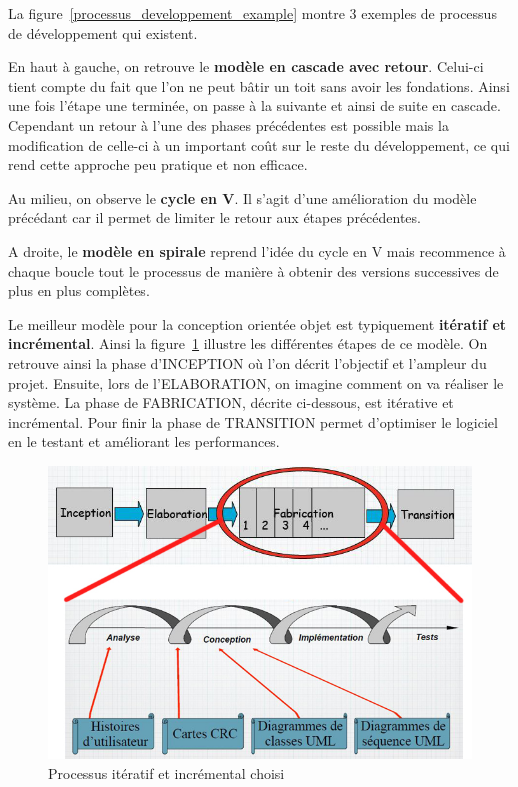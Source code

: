 La figure~\ref{processus_developpement_example}
montre 3 exemples de processus de développement qui existent.

En haut à gauche, on retrouve le \textbf{modèle en cascade avec retour}.
Celui-ci tient compte du fait que l'on ne peut bâtir
un toit sans avoir les fondations.
Ainsi une fois l'étape une terminée,
on passe à la suivante et ainsi de suite en cascade.
Cependant un retour à l'une des phases précédentes est possible mais
la modification de celle-ci à un important coût sur le reste du développement,
ce qui rend cette approche peu pratique et non efficace.

Au milieu, on observe le \textbf{cycle en V}.
Il s'agit d'une amélioration du modèle précédant
car il permet de limiter le retour aux étapes précédentes.

A droite, le \textbf{modèle en spirale} reprend l'idée du cycle en V mais
recommence à chaque boucle tout le processus de manière à obtenir
des versions successives de plus en plus complètes.

Le meilleur modèle pour la conception orientée objet est
typiquement \textbf{itératif et incrémental}.
Ainsi la figure~\ref{processus_developpement_choisi}
illustre les différentes étapes de ce modèle.
On retrouve ainsi la phase d'INCEPTION où l'on
décrit l'objectif et l'ampleur du projet.
Ensuite, lors de l'ELABORATION, on imagine comment on va réaliser le système.
La phase de FABRICATION, décrite ci-dessous, est itérative et incrémental.
Pour finir la phase de TRANSITION permet d'optimiser le logiciel
en le testant et améliorant les performances.
\begin{figure}[h]
  \centering
  \includegraphics[scale=0.65]{processus_developpement_choisi.jpg}
  \caption{Processus itératif et incrémental choisi}
  \label{processus_developpement_choisi}
\end{figure}

